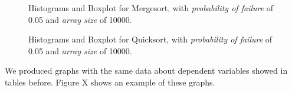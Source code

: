 \begin{figure}[H]
    \centering
    \caption{Histograms and Boxplot for Mergesort, with \textit{probability of failure} of 0.05 and \textit{array size} of 10000.}
    \label{fig-histogram-boxplot-merge-00510000}
\end{figure}

\begin{figure}[H]
    \centering
    \caption{Histograms and Boxplot for Quicksort, with \textit{probability of failure} of 0.05 and \textit{array size} of 10000.}
    \label{fig-histogram-boxplot-quick-00510000}
\end{figure}

We produced graphs with the same data about dependent variables showed in tables before. Figure X shows an example of these graphs.